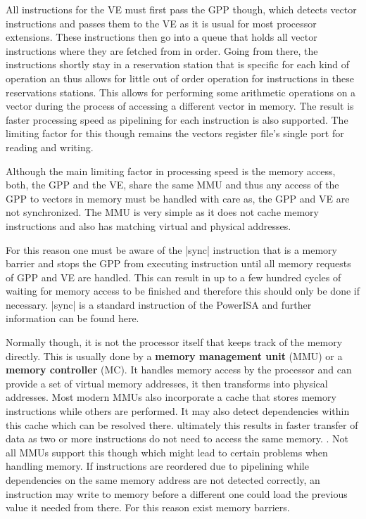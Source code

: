 All instructions for the VE must first pass the GPP though, which detects vector instructions and passes them to the VE as it is usual for most processor extensions.
These instructions then go into a queue that holds all vector instructions where they are fetched from in order.
Going from there, the instructions shortly stay in a reservation station that is specific for each kind of operation an thus allows for little out of order operation for instructions in these reservations stations.
This allows for performing some arithmetic operations on a vector during the process of accessing a different vector in memory.
The result is faster processing speed as pipelining for each instruction is also supported.
The limiting factor for this though remains the vectors register file's single port for reading and writing.

Although the main limiting factor in processing speed is the memory access, both, the GPP and the VE, share the same MMU and thus any access of the GPP to vectors in memory must be handled with care as, the GPP and VE are not synchronized.
The MMU is very simple as it does not cache memory instructions and also has matching virtual and physical addresses.

For this reason one must be aware of the |sync| instruction that is a memory barrier and stops the GPP from executing instruction until all memory requests of GPP and VE are handled.
This can result in up to a few hundred cycles of waiting for memory access to be finished and therefore this should only be done if necessary.
|sync| is a standard instruction of the PowerISA and further information can be found here. 


Normally though, it is not the processor itself that keeps track of the memory directly.
This is usually done by a \textbf{memory management unit} (MMU) or a \textbf{memory controller} (MC).
It handles memory access by the processor and can provide a set of virtual memory addresses, it then transforms into physical addresses.
Most modern MMUs also incorporate a cache that stores memory instructions while others are performed.
It may also detect dependencies within this cache which can be resolved there.
ultimately this results in faster transfer of data as two or more instructions do not need to access the same memory.
.
Not all MMUs support this though which might lead to certain problems when handling memory.
If instructions are reordered due to pipelining while dependencies on the same memory address are not detected correctly, an instruction may write to memory before a different one could load the previous value it needed from there.
For this reason exist memory barriers.

